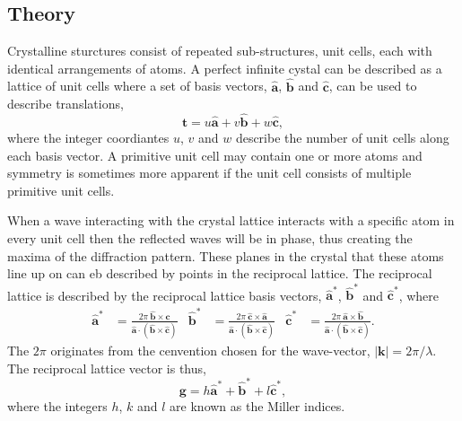 \subsection{Theory}

Crystalline sturctures consist of repeated sub-structures, unit cells, each with identical arrangements of atoms.
A perfect infinite cystal can be described as a lattice of unit cells where a set of basis vectors, $\mathbf{\hat{a}}$, $\mathbf{\hat{b}}$ and $\mathbf{\hat{c}}$, can be used to describe translations,
\begin{equation}
\mathbf{t} = u\mathbf{\hat{a}} + v\mathbf{\hat{b}} + w\mathbf{\hat{c}},
\end{equation}
where the integer coordiantes $u$, $v$ and $w$ describe the number of unit cells along each basis vector.
A primitive unit cell may contain one or more atoms and symmetry is sometimes more apparent if the unit cell consists of multiple primitive unit cells.

When a wave interacting with the crystal lattice interacts with a specific atom in every unit cell then the reflected waves will be in phase, thus creating the maxima of the diffraction pattern.
These planes in the crystal that these atoms line up on can eb described by points in the reciprocal lattice.
The reciprocal lattice is described by the reciprocal lattice basis vectors, $\mathbf{\hat{a}^*}$, $\mathbf{\hat{b}^*}$ and $\mathbf{\hat{c}^*}$, where
\begin{align}
\mathbf{\hat{a}^*}&=\frac{2\pi\:\mathbf{\hat{b}}\times\mathbf{\hat{c}}}{\mathbf{\hat{a}}\cdot (\mathbf{\hat{b}} \times \mathbf{\hat{c}})}  &  \mathbf{\hat{b}^*}&=\frac{2\pi\:\mathbf{\hat{c}}\times\mathbf{\hat{a}}}{\mathbf{\hat{a}}\cdot (\mathbf{\hat{b}} \times \mathbf{\hat{c}})}  &  \mathbf{\hat{c}^*}&=\frac{2\pi\:\mathbf{\hat{a}}\times\mathbf{\hat{b}}}{\mathbf{\hat{a}}\cdot (\mathbf{\hat{b}} \times \mathbf{\hat{c}})}.
\end{align}
The $2\pi$ originates from the cenvention chosen for the wave-vector, $|\mathbf{k}|=2\pi/\lambda$. The reciprocal lattice vector is thus,
\begin{equation}
\mathbf{g} = h\mathbf{\hat{a}^*} + \mathbf{\hat{b}^*} + l\mathbf{\hat{c}^*},
\end{equation}
where the integers $h$, $k$ and $l$ are known as the Miller indices.

